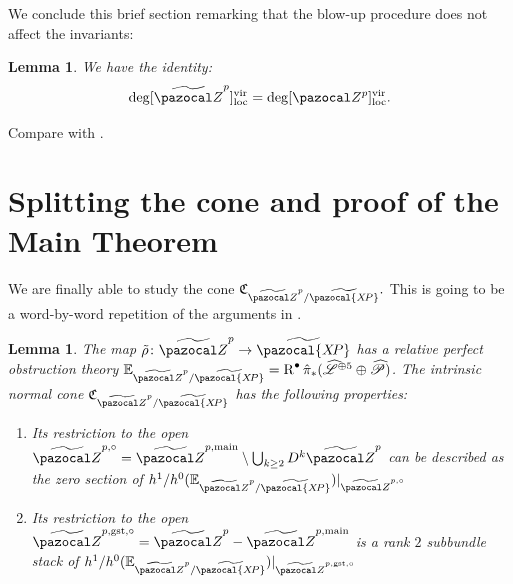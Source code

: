 \documentclass[11pt]{amsart}
\renewcommand{\to}{\rightarrow}
\newcommand{\tXP}{\widetilde{\pazocal{X\!P}}}
\newcommand{\hL}{\widehat{\mathcal L}}
\newcommand{\Zp}{\pazocal Z^p}
\newcommand{\tZ}{\widetilde{\pazocal Z}}
\newcommand{\tZp}{\widetilde{\pazocal Z}^p}
\newcommand{\R}{\operatorname{R}}
\newcommand{\virloc}[1]{[#1]^{\rm{vir}}_{\rm{loc}}}
\theoremstyle{plain}
\newtheorem{lem}[thm]{Lemma}
\theoremstyle{definition}
\begin{document}
We conclude this brief section remarking that the blow-up procedure does not affect the invariants:
\begin{lem}\label{lem:tilding}
We have the identity:
\[\deg\virloc{\tZp}=\deg\virloc{\Zp}.\]
\end{lem}
Compare with \cite[Proposition~2.5]{CL}.
\section{Splitting the cone and proof of the Main Theorem}\label{section:main_proof}
We are finally able to study the cone $\mathfrak{C}_{\tZp/\tXP}.$ This is going to be a word-by-word repetition of the arguments in \cite{CLpfields}.
\begin{lem}\label{lem:open_cones}
The map $\tilde{\rho}\colon \tZp\to\tXP$ has a relative perfect obstruction theory $\mathbb {E}_{\tZp/\tXP}=\R^{\bullet}\hat\pi_*(\hL^{\oplus 5}\oplus\widehat{\mathcal P})$. The intrinsic normal cone $\mathfrak{C}_{\tZp/\tXP}$ has the following properties:
\begin{enumerate}
\item Its restriction to the open $\tZ^{p,\circ}= \tZ^{p,\rm{main}}\setminus \bigcup_{k\geq 2}D^k \tZp$ can be described as the zero section of $h^1/h^0(\mathbb {E}_{\tZp/\tXP})\rvert_{\tZ^{p,\circ}}$
\item Its restriction to the open $\tZ^{p,\rm{gst},\circ}=\tZp - \tZ^{p,\rm{main}}$  is a rank $2$ subbundle stack of $h^1/h^0(\mathbb {E}_{\tZp/\tXP})\rvert_{\tZ^{p,\rm{gst},\circ}}$
\end{enumerate}
\end{lem}
\end{document}
